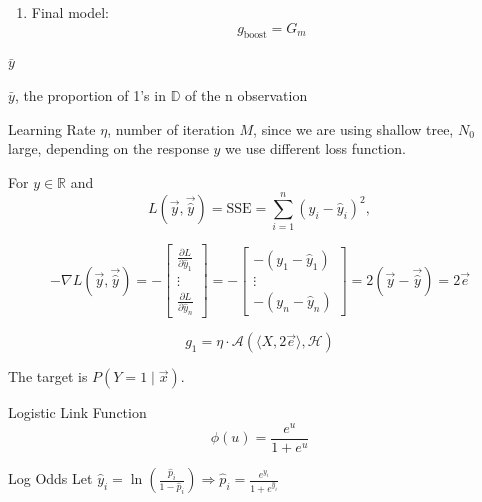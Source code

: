 \documentclass[12pt]{article}
\begin{document}
\begin{enumerate}
\begin{enumerate}
    \item Final model:
    \[
    g_{\text{boost}} = G_m
    \]
\end{enumerate}


$\bar{y}$


$\bar{y}$, the proportion of 1's in $\mathbb{D}$ of the n observation


Learning Rate $\eta$, number of iteration $M$, since we are using shallow tree, $N_0$ large, depending on the response $y$ we use different loss function.



For \( y \in \mathbb{R} \) and 
\[
L(\vec{y}, \vec{\hat{y}}) = \text{SSE} = \sum_{i=1}^n (y_i - \hat{y}_i)^2,
\]

\[
-\nabla L(\vec{y}, \vec{\hat{y}}) 
= - 
\begin{bmatrix}
\frac{\partial L}{\partial \hat{y}_1} \\
\vdots \\
\frac{\partial L}{\partial \hat{y}_n}
\end{bmatrix}
= -
\begin{bmatrix}
-(y_1 - \hat{y}_1) \\
\vdots \\
-(y_n - \hat{y}_n)
\end{bmatrix}
= 2(\vec{y} - \vec{\hat{y}}) = 2\vec{e}
\]

\[
g_1 = \eta \cdot \mathcal{A}(\langle X, 2\vec{e} \rangle, \mathcal{H})
\]




The target is \( P(Y = 1 \mid \vec{x}) \).

Logistic Link Function
\[
\phi(u) = \frac{e^u}{1 + e^u}
\]

Log Odds
Let \( \hat{y}_i = \ln\left( \frac{\hat{p}_i}{1 - \hat{p}_i} \right) \Rightarrow \hat{p}_i = \frac{e^{\hat{y}_i}}{1 + e^{\hat{y}_i}} \)


\end{enumerate}
\end{document}
